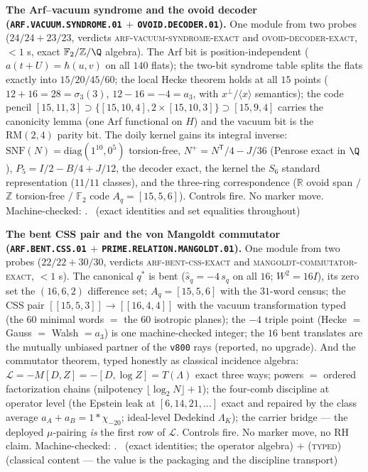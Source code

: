 \documentclass[11pt,a4paper]{article}
\newcommand{\Z}{\mathbb{Z}}
\theoremstyle{definition}
\begin{document}
\par\smallskip\noindent\textbf{The Arf--vacuum syndrome and the
ovoid decoder (\texttt{ARF.VACUUM.SYNDROME.01} $+$
\texttt{OVOID.DECODER.01}).}
One module from two probes ($24/24 + 23/23$, verdicts
\textsc{arf-vacuum-syndrome-exact} and
\textsc{ovoid-decoder-exact}, ${<}1$ s, exact
$\mathbb{F}_2/\Z/\Q$ algebra).  The Arf bit is position-independent
($a(t{+}U) = \hbar(u,v)$ on all $140$ flats); the two-bit
syndrome table splits the flats exactly into $15/20/45/60$; the
local Hecke theorem holds at all $15$ points ($12 + 16 = 28 =
\sigma_3(3)$, $12 - 16 = -4 = a_3$, with $x^{\perp}/\langle
x\rangle$ semantics); the code pencil $[15,11,3] \supset
\{[15,10,4], 2\times[15,10,3]\} \supset [15,9,4]$ carries the
canonicity lemma (one Arf functional on $H$) and the vacuum bit
is the $\mathrm{RM}(2,4)$ parity bit.  The doily kernel gains
its integral inverse: $\mathrm{SNF}(N) = \mathrm{diag}(1^{10},
0^5)$ torsion-free, $N^{+} = N^{\mathsf T}/4 - J/36$ (Penrose
exact in $\Q$), $P_5 = I/2 - B/4 + J/12$, the decoder exact, the
kernel the $S_6$ standard representation ($11/11$ classes), and
the three-ring correspondence ($\mathbb{R}$ ovoid span $/$ $\Z$
torsion-free $/$ $\mathbb{F}_2$ code $A_q = [15,5,6]$).  Controls fire.
No marker move.
Machine-checked: .
\mE\ (exact identities and set equalities throughout)
\par\smallskip

\par\smallskip\noindent\textbf{The bent CSS pair and the von
Mangoldt commutator (\texttt{ARF.BENT.CSS.01} $+$
\texttt{PRIME.RELATION.MANGOLDT.01}).}
One module from two probes ($22/22 + 30/30$, verdicts
\textsc{arf-bent-css-exact} and
\textsc{mangoldt-commutator-exact}, ${<}1$ s).  The canonical
$q^{*}$ is bent ($\hat s_q = -4\,s_q$ on all $16$; $W^2 = 16I$),
its zero set the $(16,6,2)$ difference set; $A_q = [15,5,6]$
with the $31$-word census; the CSS pair $[[15,5,3]] \to
[[16,4,4]]$ with the vacuum transformation typed (the $60$
minimal words $=$ the $60$ isotropic planes); the $-4$ triple
point (Hecke $=$ Gauss $=$ Walsh $= a_3$) is one machine-checked
integer; the $16$ bent translates are the mutually unbiased
partner of the \texttt{v800} rays (reported, no upgrade).  And
the commutator theorem, typed honestly as classical incidence
algebra: $\mathcal L = -M[D,Z] = -[D, \log Z] = T(\Lambda)$
exact three ways; powers $=$ ordered factorization chains
(nilpotency $\lfloor\log_2 N\rfloor + 1$); the four-comb
discipline at operator level (the Epstein leak at $[6,14,21,
\dots]$ exact and repaired by the class average $a_A + a_B =
1 * \chi_{-20}$; ideal-level Dedekind $\Lambda_K$); the carrier
bridge --- the deployed $\mu$-pairing \emph{is} the first row of
$\mathcal L$.  Controls fire.  No marker move, no RH claim.
Machine-checked: .
\mE\ (exact identities; the operator algebra) $+$
(\textsc{typed}) (classical content --- the value is the
packaging and the discipline transport)
\par\smallskip
\end{document}
